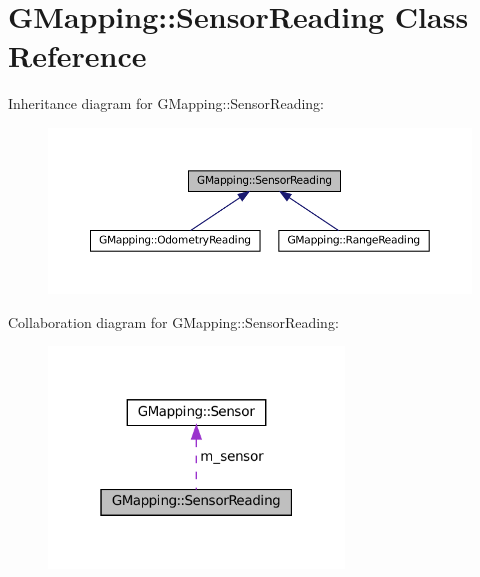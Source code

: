 \hypertarget{classGMapping_1_1SensorReading}{}\section{G\+Mapping\+:\+:Sensor\+Reading Class Reference}
\label{classGMapping_1_1SensorReading}


Inheritance diagram for G\+Mapping\+:\+:Sensor\+Reading\+:
\nopagebreak
\begin{figure}[H]
\begin{center}
\leavevmode
\includegraphics[width=350pt]{classGMapping_1_1SensorReading__inherit__graph}
\end{center}
\end{figure}


Collaboration diagram for G\+Mapping\+:\+:Sensor\+Reading\+:
\nopagebreak
\begin{figure}[H]
\begin{center}
\leavevmode
\includegraphics[width=223pt]{classGMapping_1_1SensorReading__coll__graph}
\end{center}
\end{figure}

